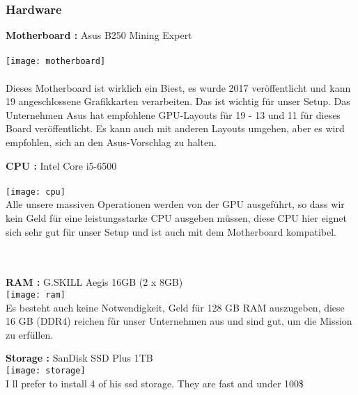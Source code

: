 \documentclass[ngerman]{scrreprt}
\begin{document}
\subsubsection{Hardware}
\begin{large}
	\textbf{Motherboard :} Asus B250 Mining Expert \\ \\
	\texttt{[image: motherboard]}  \\ \\
	Dieses Motherboard ist wirklich ein Biest, es wurde 2017 veröffentlicht und kann 19 angeschlossene Grafikkarten verarbeiten. Das ist wichtig für unser Setup.
	Das Unternehmen Asus hat empfohlene GPU-Layouts für 19 - 13 und 11 für dieses Board veröffentlicht. Es kann auch mit anderen Layouts umgehen, aber es wird empfohlen, sich an den Asus-Vorschlag zu halten.
	
\end{large}
\newpage
\begin{large}
	\textbf{CPU :} Intel Core i5-6500 \\ \\
	\texttt{[image: cpu]}  \\ 
	Alle unsere massiven Operationen werden von der GPU ausgeführt, so dass wir kein Geld für eine leistungsstarke CPU ausgeben müssen, diese CPU hier eignet sich sehr gut für unser Setup und ist auch mit dem Motherboard kompatibel. \\ \\ \\
	
\end{large}
\begin{large}
	\textbf{RAM :} G.SKILL Aegis 16GB (2 x 8GB) \\ 
	\texttt{[image: ram]}  \\
	Es besteht auch keine Notwendigkeit, Geld für 128 GB RAM auszugeben, diese 16 GB (DDR4) reichen für unser Unternehmen aus und sind gut, um die Mission zu erfüllen. \\
	
	
	
\end{large}
\newpage
\begin{large}
	\textbf{Storage :} SanDisk SSD Plus 1TB \\ 
	\texttt{[image: storage]}  \\
	I ll prefer to install 4 of his ssd storage. They are fast and under 100\$	\\
\end{large}
\end{document}
